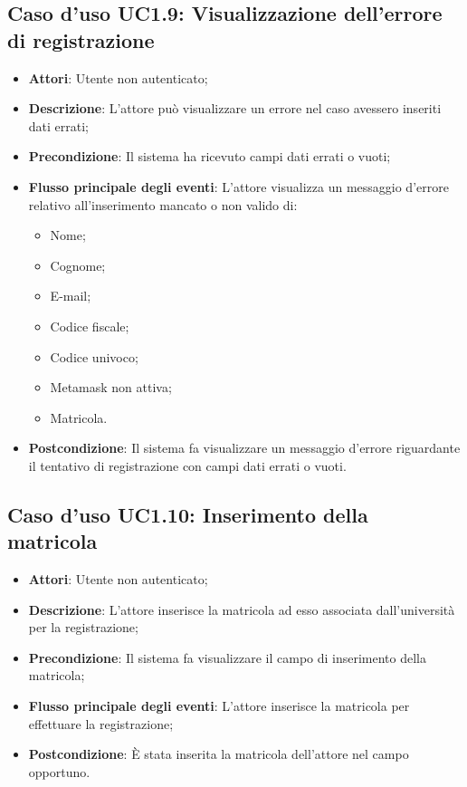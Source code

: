 \subsection{Caso d'uso \texorpdfstring{UC1.9}{UC1.9}: Visualizzazione dell'errore di registrazione}
\begin{itemize}
	\item \textbf{Attori}: Utente non autenticato;
	\item \textbf{Descrizione}: L'attore può visualizzare un errore nel caso avessero inseriti dati errati;
	\item \textbf{Precondizione}: Il sistema ha ricevuto campi dati errati o vuoti;
	\item \textbf{Flusso principale degli eventi}: L'attore visualizza un messaggio d'errore relativo all'inserimento mancato o non valido di:
	\begin{itemize}
		\item Nome;
		\item Cognome;
		\item E-mail;
		\item Codice fiscale;
		\item Codice univoco;
		\item Metamask non attiva;
		\item Matricola.
	\end{itemize}
	\item \textbf{Postcondizione}: Il sistema fa visualizzare un messaggio d'errore riguardante il tentativo di registrazione con campi dati errati o vuoti.
\end{itemize}
\subsection{Caso d'uso \texorpdfstring{UC1.10}{UC1.10}: Inserimento della matricola}
\begin{itemize}
	\item \textbf{Attori}: Utente non autenticato;
	\item \textbf{Descrizione}: L'attore inserisce la matricola ad esso associata dall'università per la registrazione;
	\item \textbf{Precondizione}: Il sistema fa visualizzare il campo di inserimento della matricola;
	\item \textbf{Flusso principale degli eventi}: L'attore inserisce la matricola per effettuare la registrazione;
	\item \textbf{Postcondizione}: È stata inserita la matricola dell'attore nel campo opportuno.
\end{itemize}
